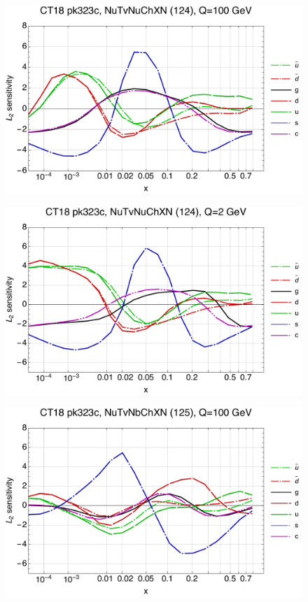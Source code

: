 \documentclass[10pt,aps,prd,floatfix,titlepage]{revtex4}
\begin{document}
\clearpage
\begin{figure}
\includegraphics[width=\textwidth,height=0.44\textheight,keepaspectratio]{1/124_ct18nn_L2_q100_Sf_1.pdf}
\caption{}
\end{figure}
\begin{figure}
\includegraphics[width=\textwidth,height=0.44\textheight,keepaspectratio]{1/124_ct18nn_L2_q2_Sf_1.pdf}
\caption{}
\end{figure}
\clearpage
\begin{figure}
\includegraphics[width=\textwidth,height=0.44\textheight,keepaspectratio]{1/125_ct18nn_L2_q100_Sf_1.pdf}
\caption{}
\end{figure}
\end{document}
